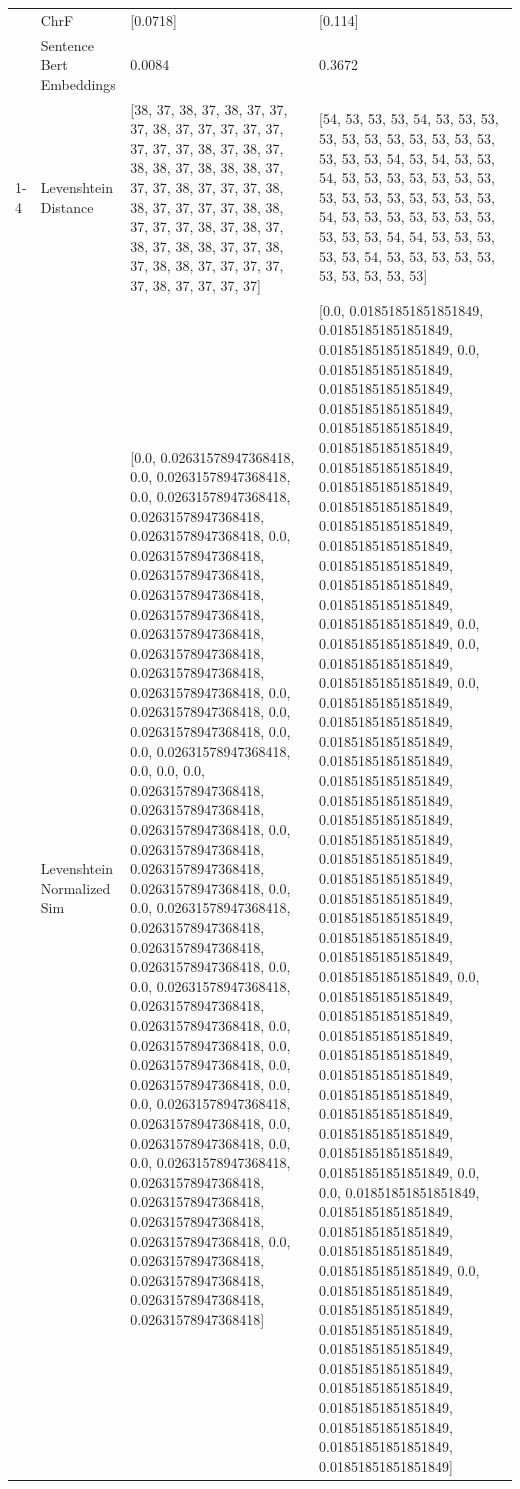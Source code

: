 \begin{tabular}{llll}
 & ChrF & [0.0718] & [0.114] \\
 & Sentence Bert Embeddings & 0.0084 & 0.3672 \\
\cline{1-4}
\multirow[t]{4}{*}{Kaihu koruri gatigaga kwao gugithinjwo} & Levenshtein Distance & [38, 37, 38, 37, 38, 37, 37, 37, 38, 37, 37, 37, 37, 37, 37, 37, 37, 38, 37, 38, 37, 38, 38, 37, 38, 38, 38, 37, 37, 37, 38, 37, 37, 37, 38, 38, 37, 37, 37, 37, 38, 38, 37, 37, 37, 38, 37, 38, 37, 38, 37, 38, 38, 37, 37, 38, 37, 38, 38, 37, 37, 37, 37, 37, 38, 37, 37, 37, 37] & [54, 53, 53, 53, 54, 53, 53, 53, 53, 53, 53, 53, 53, 53, 53, 53, 53, 53, 53, 54, 53, 54, 53, 53, 54, 53, 53, 53, 53, 53, 53, 53, 53, 53, 53, 53, 53, 53, 53, 53, 54, 53, 53, 53, 53, 53, 53, 53, 53, 53, 53, 54, 54, 53, 53, 53, 53, 53, 54, 53, 53, 53, 53, 53, 53, 53, 53, 53, 53] \\
 & Levenshtein Normalized Sim & [0.0, 0.02631578947368418, 0.0, 0.02631578947368418, 0.0, 0.02631578947368418, 0.02631578947368418, 0.02631578947368418, 0.0, 0.02631578947368418, 0.02631578947368418, 0.02631578947368418, 0.02631578947368418, 0.02631578947368418, 0.02631578947368418, 0.02631578947368418, 0.02631578947368418, 0.0, 0.02631578947368418, 0.0, 0.02631578947368418, 0.0, 0.0, 0.02631578947368418, 0.0, 0.0, 0.0, 0.02631578947368418, 0.02631578947368418, 0.02631578947368418, 0.0, 0.02631578947368418, 0.02631578947368418, 0.02631578947368418, 0.0, 0.0, 0.02631578947368418, 0.02631578947368418, 0.02631578947368418, 0.02631578947368418, 0.0, 0.0, 0.02631578947368418, 0.02631578947368418, 0.02631578947368418, 0.0, 0.02631578947368418, 0.0, 0.02631578947368418, 0.0, 0.02631578947368418, 0.0, 0.0, 0.02631578947368418, 0.02631578947368418, 0.0, 0.02631578947368418, 0.0, 0.0, 0.02631578947368418, 0.02631578947368418, 0.02631578947368418, 0.02631578947368418, 0.02631578947368418, 0.0, 0.02631578947368418, 0.02631578947368418, 0.02631578947368418, 0.02631578947368418] & [0.0, 0.01851851851851849, 0.01851851851851849, 0.01851851851851849, 0.0, 0.01851851851851849, 0.01851851851851849, 0.01851851851851849, 0.01851851851851849, 0.01851851851851849, 0.01851851851851849, 0.01851851851851849, 0.01851851851851849, 0.01851851851851849, 0.01851851851851849, 0.01851851851851849, 0.01851851851851849, 0.01851851851851849, 0.01851851851851849, 0.0, 0.01851851851851849, 0.0, 0.01851851851851849, 0.01851851851851849, 0.0, 0.01851851851851849, 0.01851851851851849, 0.01851851851851849, 0.01851851851851849, 0.01851851851851849, 0.01851851851851849, 0.01851851851851849, 0.01851851851851849, 0.01851851851851849, 0.01851851851851849, 0.01851851851851849, 0.01851851851851849, 0.01851851851851849, 0.01851851851851849, 0.01851851851851849, 0.0, 0.01851851851851849, 0.01851851851851849, 0.01851851851851849, 0.01851851851851849, 0.01851851851851849, 0.01851851851851849, 0.01851851851851849, 0.01851851851851849, 0.01851851851851849, 0.01851851851851849, 0.0, 0.0, 0.01851851851851849, 0.01851851851851849, 0.01851851851851849, 0.01851851851851849, 0.01851851851851849, 0.0, 0.01851851851851849, 0.01851851851851849, 0.01851851851851849, 0.01851851851851849, 0.01851851851851849, 0.01851851851851849, 0.01851851851851849, 0.01851851851851849, 0.01851851851851849, 0.01851851851851849] \\

\end{tabular}
